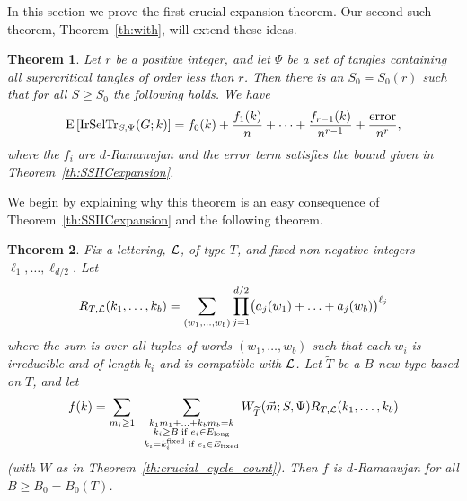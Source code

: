 \documentclass[12pt]{article}
\newtheorem{theorem}{Theorem}[section]
\newcommand{\dtreelike}{{$d$-Ramanujan}}
\newcommand{\El}{{E_{\rm long}}}
\newcommand{\Ef}{{E_{\rm fixed}}}
\newcommand{\kf}{k^{\rm fixed}}
\newcommand{\cl}{{\cal L}}
\newcommand{\tset}{{\Psi}}
\newcommand{\irdsel}{{\rm IrSelTr}}
\newcommand{\E}[1]{\mbox{E}\left[#1\right] }
\begin{document}
In this section we prove the first crucial expansion theorem.
Our second such theorem, Theorem~\ref{th:with}, will extend these ideas.

\begin{theorem}\label{th:main_expansion}
Let $r$ be a positive integer, and let $\tset$ be a set of
tangles containing all supercritical tangles of order less than $r$.
Then there is an $S_0=S_0(r)$
such that for all $S\ge S_0$ the following holds.  
We have
$$
\E{\irdsel_{S,\tset}(G;k)} = f_0(k)+\frac{  f_1(k)}{n}+\cdots+
\frac{  f_{r-1}(k)}{n^{r-1}}+\frac{{\rm error}}{n^r},
$$
where 
the $f_i$ are {\dtreelike} and the error term satisfies the bound given in
Theorem~\ref{th:SSIICexpansion}.
\end{theorem}

We begin by explaining why this theorem is an easy consequence of
Theorem~\ref{th:SSIICexpansion}
and the following theorem.

\begin{theorem}\label{th:reduce1}
Fix a lettering, $\cl$, of type $T$, and fixed non-negative
integers 
$\ell_1,\ldots,\ell_{d/2}$.  Let
$$
R_{T,\cl}(k_1,\ldots,k_b) = 
\sum_{(w_1,\ldots,w_b)} 
\prod_{j=1}^{d/2}
\bigl( a_j(w_1)+\ldots+a_j(w_b) \bigr)^{\ell_j}
$$
where the sum is over all tuples of words $(w_1,\ldots,w_b)$ such that each
$w_i$ is irreducible and of length $k_i$ and is compatible with $\cl$.
Let $\widetilde T$ be a $B$-new type based on $T$, and let
\begin{equation}\label{eq:define_f}
f(k) = \sum_{m_i\ge 1}\;\;
\sum_{\substack{ k_1m_1+\ldots+k_bm_b=k\\ k_i\ge B\;{\rm if}\;e_i\in
\El \\ k_i=\kf_i\;{\rm if}\;e_i\in \Ef}}
W_{\widetilde T}(\vec m;S,\tset)R_{T,\cl}(k_1,\ldots,k_b)
\end{equation}
(with $W$ as in Theorem~\ref{th:crucial_cycle_count}).  Then
$f$ is {\dtreelike} for all $B\ge B_0=B_0(T)$.
\end{theorem}
\end{document}
